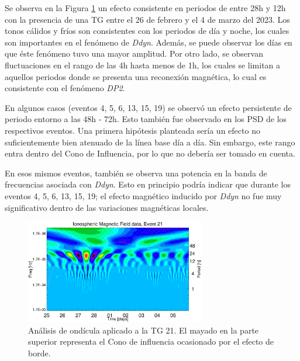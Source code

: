 Se observa en la Figura \ref{fig:wave} un efecto consistente en periodos de entre 28h y 12h con la presencia de una TG entre el 26 de febrero y el 4 de marzo del 2023. Los tonos cálidos y fríos son consistentes con los periodos de día y noche, los cuales son importantes en el fenómeno de \emph{Ddyn}. Además, se puede observar los días en que éste fenómeno tuvo una mayor amplitud. Por otro lado, se observan fluctuaciones en el rango de las 4h hasta menos de 1h, los cuales se limitan a aquellos periodos donde se presenta una reconexión magnética, lo cual es consistente con el fenómeno \emph{DP2}. 
\vspace{1 em}

En algunos casos (eventos 4, 5, 6, 13, 15, 19) se observó un efecto persistente de periodo entorno a las 48h - 72h. Esto también fue observado en los PSD de los respectivos eventos. Una primera hipótesis planteada sería un efecto no suficientemente bien atenuado de la línea base día a día. Sin embargo, este rango entra dentro del Cono de Influencia, por lo que no debería ser tomado en cuenta.  
\vspace{1 em}

En esos mismos eventos, también se observa una potencia en la banda de frecuencias asociada con \emph{Ddyn}. Esto en principio podría indicar que durante los eventos 4, 5, 6, 13, 15, 19; el efecto magnético inducido por \emph{Ddyn} no fue muy significativo dentro de las variaciones magnéticas locales. 
\vspace{1 em}



\begin{figure}
    \centering
     \includegraphics[width=0.7\textwidth]{Images/cap2/wave/wave_2023-02-25.uncut.eps}
      \caption{Análisis de ondícula aplicado a la TG 21. El mayado en la parte superior representa el Cono de influencia ocasionado por el efecto de borde.}
       \label{fig:wave}
\end{figure}


